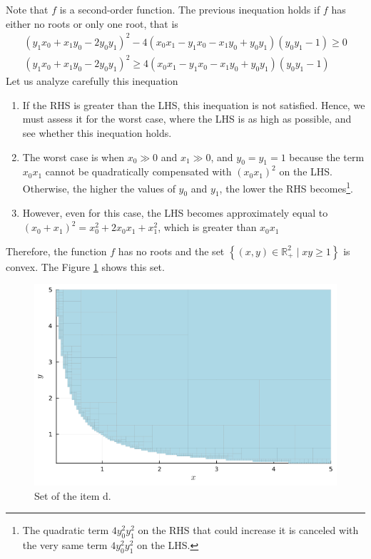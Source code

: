 \documentclass[12pt,a4paper]{article}
\begin{document}
Note that \(f\) is a second-order function. The previous inequation holds if \(f\) has either no roots or only one root, that is
\begin{align}
    (y_1 x_0 + x_1 y_0 - 2y_0 y_1)^2 - 4(x_0 x_1 - y_1 x_0 - x_1 y_0 + y_0 y_1 )(y_0 y_1 - 1) \geq 0 \\
    (y_1 x_0 + x_1 y_0 - 2y_0 y_1)^2 \geq 4(x_0 x_1 - y_1 x_0 - x_1 y_0 + y_0 y_1 )(y_0 y_1 - 1)
\end{align}
Let us analyze carefully this inequation
\begin{enumerate}
    \item If the RHS is greater than the LHS, this inequation is not satisfied. Hence, we must assess it for the worst case, where the LHS is as high as possible, and see whether this inequation holds.
    \item The worst case is when \(x_0 \gg 0\) and \(x_1 \gg 0\), and \(y_0=y_1=1\) because the term \(x_0 x_1\) cannot be quadratically compensated with \((x_0 x_1)^2\) on the LHS. Otherwise, the higher the values of \(y_0\) and \(y_1\), the lower the RHS becomes\footnote{The quadratic term \(4y_0^2 y_1^2\) on the RHS that could increase it is canceled with the very same term \(4y_0^2 y_1^2\) on the LHS.}.
    \item However, even for this case, the LHS becomes approximately equal to \((x_0 + x_1)^2 = x_0^2 + 2x_0x_1 + x_1^2\), which is greater than \(x_0x_1\)
\end{enumerate}

Therefore, the function \(f\) has no roots and the set \(\left\{ (x,y) \in \mathbb{R}_{+}^{2} \mid xy \geq 1 \right\}\) is convex. The Figure \ref{fig:2.8d} shows this set.
\begin{figure}[H]
    \centering
    \includegraphics[scale=0.4]{figs/2.8d.png}
    \caption{Set of the item d.}
    \label{fig:2.8d}
\end{figure}
\end{document}
